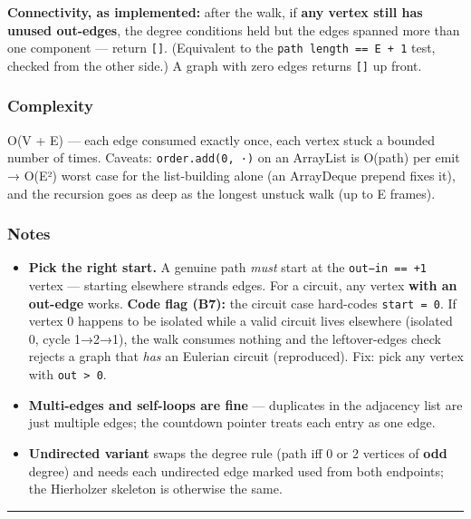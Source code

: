 \documentclass[
  10pt,
  letterpaper,
  onecolumn]{article}
\providecommand{\tightlist}{%
  \setlength{\itemsep}{0pt}\setlength{\parskip}{0pt}}
\begin{document}
\textbf{Connectivity, as implemented:} after the walk, if \textbf{any
vertex still has unused out-edges}, the degree conditions held but the
edges spanned more than one component --- return \texttt{{[}{]}}.
(Equivalent to the \texttt{path\ length\ ==\ E\ +\ 1} test, checked from
the other side.) A graph with zero edges returns \texttt{{[}{]}} up
front.

\hypertarget{complexity-22}{%
\subsubsection{Complexity}\label{complexity-22}}

O(V + E) --- each edge consumed exactly once, each vertex stuck a
bounded number of times. Caveats: \texttt{order.add(0,\ ·)} on an
ArrayList is O(path) per emit → O(E²) worst case for the list-building
alone (an ArrayDeque prepend fixes it), and the recursion goes as deep
as the longest unstuck walk (up to E frames).

\hypertarget{notes-21}{%
\subsubsection{Notes}\label{notes-21}}

\begin{itemize}
\tightlist
\item
  \textbf{Pick the right start.} A genuine path \emph{must} start at the
  \texttt{out−in\ ==\ +1} vertex --- starting elsewhere strands edges.
  For a circuit, any vertex \textbf{with an out-edge} works.
  \textbf{Code flag (B7):} the circuit case hard-codes
  \texttt{start\ =\ 0}. If vertex 0 happens to be isolated while a valid
  circuit lives elsewhere (isolated 0, cycle 1→2→1), the walk consumes
  nothing and the leftover-edges check rejects a graph that \emph{has}
  an Eulerian circuit (reproduced). Fix: pick any vertex with
  \texttt{out\ \textgreater{}\ 0}.
\item
  \textbf{Multi-edges and self-loops are fine} --- duplicates in the
  adjacency list are just multiple edges; the countdown pointer treats
  each entry as one edge.
\item
  \textbf{Undirected variant} swaps the degree rule (path iff 0 or 2
  vertices of \textbf{odd} degree) and needs each undirected edge marked
  used from both endpoints; the Hierholzer skeleton is otherwise the
  same.
\end{itemize}

\begin{center}\rule{0.5\linewidth}{0.5pt}\end{center}
\end{document}

